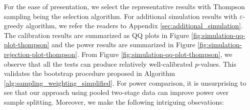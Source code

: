 \documentclass[12pt]{article}
\begin{document}
For the ease of presentation, we select the representative results with Thompson sampling being the selection algorithm. For additional simulation results with $\varepsilon$-greedy algorithm, we refer the readers to Appendix \ref{sec:additional_simulation}. The calibration results are summarized as QQ plots in Figure \ref{fig:simulation-qq-plot-thompson} and the power results are summarized in Figure \ref{fig:simulation-rejection-plot-thompson}. From Figure \ref{fig:simulation-qq-plot-thompson}, we observe that all the tests can produce relatively well-calibrated $p$-values. This validates the bootstrap procedure proposed in Algorithm \ref{alg:sampling_weighting_simplified}. For power comparison, it is unsurprising to see that our approach using pooled two-stage data can improve power over sample splitting. Moreover, we make the following intriguing obsevations:
\end{document}
